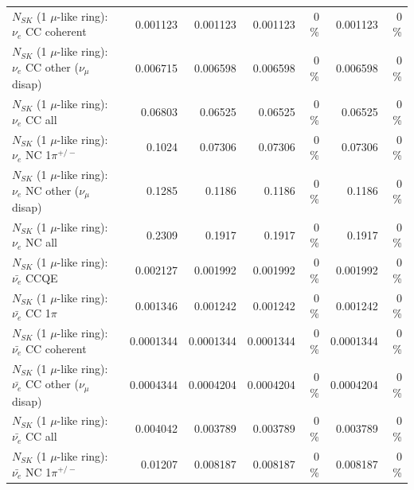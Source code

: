 \begin{table}
\begin{tabular}{| l | r | r | r  r | r  r |}
                               $N_{SK}$ (1 $\mu$-like ring): $\nu_e$ CC coherent &        0.001123 &        0.001123 &        0.001123 &        0 \%  &        0.001123 &        0 \%  \\ 
                $N_{SK}$ (1 $\mu$-like ring): $\nu_e$ CC other ($\nu_\mu$ disap) &        0.006715 &        0.006598 &        0.006598 &        0 \%  &        0.006598 &        0 \%  \\ 
                                  $N_{SK}$ (1 $\mu$-like ring): $\nu_{e}$ CC all &         0.06803 &         0.06525 &         0.06525 &        0 \%  &         0.06525 &        0 \%  \\ 
\hline
                           $N_{SK}$ (1 $\mu$-like ring): $\nu_e$ NC 1$\pi^{+/-}$ &          0.1024 &         0.07306 &         0.07306 &        0 \%  &         0.07306 &        0 \%  \\ 
                $N_{SK}$ (1 $\mu$-like ring): $\nu_e$ NC other ($\nu_\mu$ disap) &          0.1285 &          0.1186 &          0.1186 &        0 \%  &          0.1186 &        0 \%  \\ 
                                  $N_{SK}$ (1 $\mu$-like ring): $\nu_{e}$ NC all &          0.2309 &          0.1917 &          0.1917 &        0 \%  &          0.1917 &        0 \%  \\ 
\hline
\hline
\hline
                                $N_{SK}$ (1 $\mu$-like ring): $\bar{\nu_e}$ CCQE &        0.002127 &        0.001992 &        0.001992 &        0 \%  &        0.001992 &        0 \%  \\ 
                           $N_{SK}$ (1 $\mu$-like ring): $\bar{\nu_e}$ CC 1$\pi$ &        0.001346 &        0.001242 &        0.001242 &        0 \%  &        0.001242 &        0 \%  \\ 
                         $N_{SK}$ (1 $\mu$-like ring): $\bar{\nu_e}$ CC coherent &       0.0001344 &       0.0001344 &       0.0001344 &        0 \%  &       0.0001344 &        0 \%  \\ 
          $N_{SK}$ (1 $\mu$-like ring): $\bar{\nu_e}$ CC other ($\nu_\mu$ disap) &       0.0004344 &       0.0004204 &       0.0004204 &        0 \%  &       0.0004204 &        0 \%  \\ 
                            $N_{SK}$ (1 $\mu$-like ring): $\bar{\nu_{e}}$ CC all &        0.004042 &        0.003789 &        0.003789 &        0 \%  &        0.003789 &        0 \%  \\ 
\hline
                     $N_{SK}$ (1 $\mu$-like ring): $\bar{\nu_e}$ NC 1$\pi^{+/-}$ &         0.01207 &        0.008187 &        0.008187 &        0 \%  &        0.008187 &        0 \%  \\ 

\end{tabular}
\end{table}
